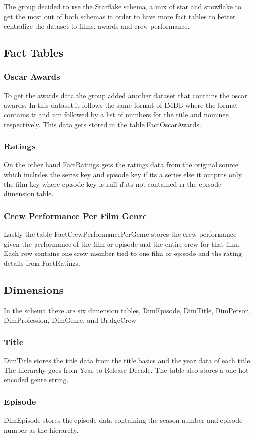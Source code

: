 The group decided to use the Starflake schema, a mix of star and snowflake to get the most out of both schemas in order to have more fact tables to better centralize the dataset to films, awards and crew performance. 
\subsection{Fact Tables}
\subsubsection{Oscar Awards}
To get the awards data the group added another dataset that contains the oscar awards. In this dataset it follows the same format of IMDB where the format contains tt and nm followed by a list of numbers for the title and nominee respectively. This data gets stored in the table FactOscarAwards. 
\subsubsection{Ratings}
On the other hand FactRatings gets the ratings data from the original source which includes the series key and episode key if its a series else it outputs only the film key where episode key is null if its not contained in the episode dimension table. 
\subsubsection{Crew Performance Per Film Genre}
Lastly the table FactCrewPerformancePerGenre stores the crew performance given the performance of the film or episode and the entire crew for that film. Each row contains one crew member tied to one film or episode and the rating details from FactRatings. 

\subsection{Dimensions}
In the schema there are six dimension tables, DimEpisode, DimTitle, DimPerson, DimProfession, DimGenre, and BridgeCrew
 
 \subsubsection{Title}
DimTitle stores the title data from the title.basics and the year data of each title. The hierarchy goes from Year to Release Decade. The table also stores a one hot encoded genre string.

\subsubsection{Episode}
DimEpisode stores the episode data containing the season number and episode number as the hierarchy.

